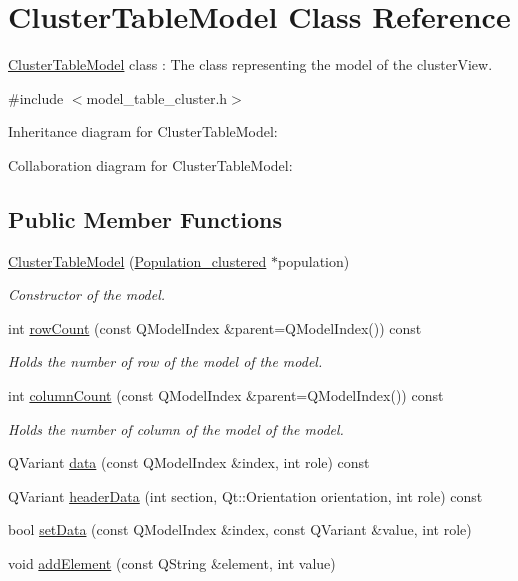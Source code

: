 \hypertarget{class_cluster_table_model}{}\section{Cluster\+Table\+Model Class Reference}
\label{class_cluster_table_model}


\hyperlink{class_cluster_table_model}{Cluster\+Table\+Model} class \+: The class representing the model of the cluster\+View.  




{\ttfamily \#include $<$model\+\_\+table\+\_\+cluster.\+h$>$}



Inheritance diagram for Cluster\+Table\+Model\+:


Collaboration diagram for Cluster\+Table\+Model\+:
\subsection*{Public Member Functions}
\begin{DoxyCompactItemize}
\item 
\hyperlink{class_cluster_table_model_a56b29a3d0efe69d1012b168e795dbbfa}{Cluster\+Table\+Model} (\hyperlink{class_population__clustered}{Population\+\_\+clustered} $\ast$population)
\begin{DoxyCompactList}\small\item\em Constructor of the model. \end{DoxyCompactList}\item 
int \hyperlink{class_cluster_table_model_a8df36437da5db2af6767a3df3154ceb4}{row\+Count} (const Q\+Model\+Index \&parent=Q\+Model\+Index()) const
\begin{DoxyCompactList}\small\item\em Holds the number of row of the model of the model. \end{DoxyCompactList}\item 
int \hyperlink{class_cluster_table_model_adab3fcef68b1958a4ced17cef8b50eec}{column\+Count} (const Q\+Model\+Index \&parent=Q\+Model\+Index()) const
\begin{DoxyCompactList}\small\item\em Holds the number of column of the model of the model. \end{DoxyCompactList}\item 
Q\+Variant \hyperlink{class_cluster_table_model_aa0e82a26bc4abde92659e9972b043cfe}{data} (const Q\+Model\+Index \&index, int role) const
\item 
Q\+Variant \hyperlink{class_cluster_table_model_aa05cacdce0f86c131522eef6a902642c}{header\+Data} (int section, Qt\+::\+Orientation orientation, int role) const
\item 
bool \hyperlink{class_cluster_table_model_a8b3e1b56923c215e0c36f9116f90df58}{set\+Data} (const Q\+Model\+Index \&index, const Q\+Variant \&value, int role)
\item 
void \hyperlink{class_cluster_table_model_a21f97aadd6e751800a92c843e6cfd170}{add\+Element} (const Q\+String \&element, int value)
\end{DoxyCompactItemize}
